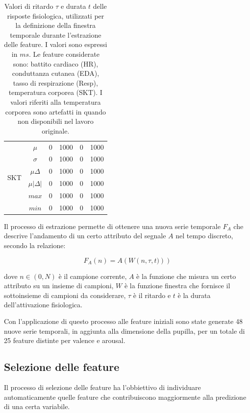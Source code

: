 \begin{table}[]
\begin{tabular}{|c|c|cc|cc|}
\hline
\multirow{6}{*}{SKT} & $\mu$                      & 0    & 1000 & 0    & 1000 \\
                     & $\sigma$                   & 0    & 1000 & 0    & 1000 \\
                     & $\mu\Delta$                & 0    & 1000 & 0    & 1000 \\
                     & $\mu\left|\Delta\right|$   & 0    & 1000 & 0    & 1000 \\
                     & $max$                      & 0    & 1000 & 0    & 1000 \\
                     & $min$                      & 0    & 1000 & 0    & 1000 \\
\hline
\end{tabular}%
\caption{Valori di ritardo $\tau$ e durata $t$ delle risposte fisiologica, utilizzati per la definizione della finestra temporale durante l'estrazione delle feature. I valori sono espressi in $ms$. Le feature considerate sono: battito cardiaco (HR), conduttanza cutanea (EDA), tasso di respirazione (Resp), temperatura corporea (SKT). I valori riferiti alla temperatura corporea sono artefatti in quando non disponibili nel lavoro originale.}
\label{tab:async_window_values}
\end{table}

Il processo di estrazione permette di ottenere una nuova serie temporale $F_A$ che descrive l'andamento di un certo attributo del segnale $A$ nel tempo discreto, secondo la relazione:

\begin{equation}
F_A(n) = A\left(W\left(n,\tau,t)\right)\right)
\end{equation}

dove $n \in (0, N)$ è il campione corrente, $A$ è la funzione che misura un certo attributo su un insieme di campioni, $W$ è la funzione finestra che fornisce il sottoinsieme di campioni da considerare, $\tau$ è il ritardo e $t$ è la durata dell'attivazione fisiologica.

Con l'applicazione di questo processo alle feature iniziali sono state generate 48 nuove serie temporali, in aggiunta alla dimensione della pupilla, per un totale di 25 feature distinte per valence e arousal.

\subsection{Selezione delle feature}
\label{section:feature_selection}
Il processo di selezione delle feature ha l'obbiettivo di individuare automaticamente quelle feature che contribuiscono maggiormente alla predizione di una certa variabile.

